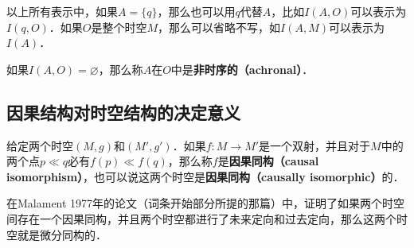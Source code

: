 以上所有表示中，如果$A=\{q\}$，那么也可以用$q$代替$A$，比如$I(A, O)$可以表示为$I(q, O)$．如果$O$是整个时空$M$，那么可以省略不写，如$I(A, M)$可以表示为$I(A)$．

如果$I(A, O)=\varnothing$，那么称$A$在$O$中是\textbf{非时序的（achronal）}．

\subsection{因果结构对时空结构的决定意义}

给定两个时空$(M, g)$和$(M', g')$．如果$f:M\rightarrow M'$是一个双射，并且对于$M$中的两个点$p\ll q$必有$f(p)\ll f(q)$，那么称$f$是\textbf{因果同构（causal isomorphism）}，也可以说这两个时空是\textbf{因果同构（causally isomorphic）}的．

在Malament 1977年的论文（词条开始部分所提的那篇）中，证明了如果两个时空间存在一个因果同构，并且两个时空都进行了未来定向和过去定向，那么这两个时空就是微分同构的．







